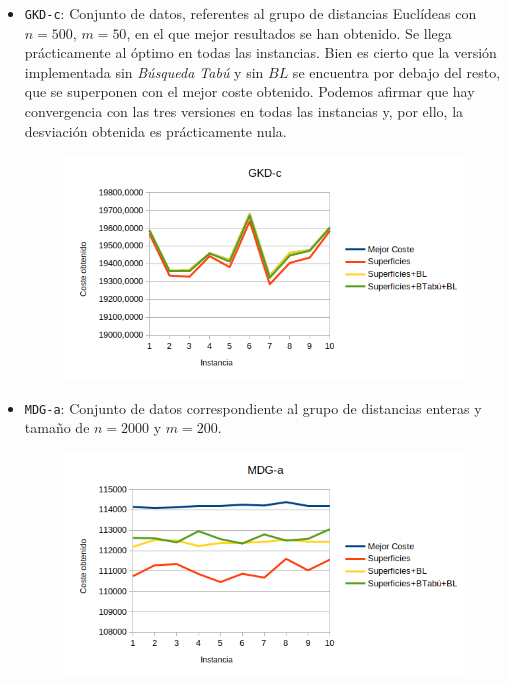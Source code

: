 \begin{itemize}
		\item \texttt{GKD-c}: Conjunto de datos, referentes al grupo de distancias Euclídeas con $n=500$, $m=50$,  en el que mejor resultados se han obtenido. Se llega prácticamente al óptimo en todas las instancias. Bien es cierto que la versión implementada sin \textit{Búsqueda Tabú} y sin $BL$ se encuentra por debajo del resto, que se superponen con el mejor coste obtenido. Podemos afirmar que hay convergencia con las tres versiones en todas las instancias y, por ello, la desviación obtenida es prácticamente nula.
	


	\begin{figure}[H]
	\centering
	\includegraphics[scale=0.55]{img/aa.png}
\end{figure}

\item \texttt{MDG-a}: Conjunto de datos correspondiente al grupo de distancias enteras y tamaño de $n=2000$ y $m=200$. 
	\begin{figure}[H]
	\centering
	\includegraphics[scale=0.55]{img/c.png}
\end{figure}


\end{itemize}
